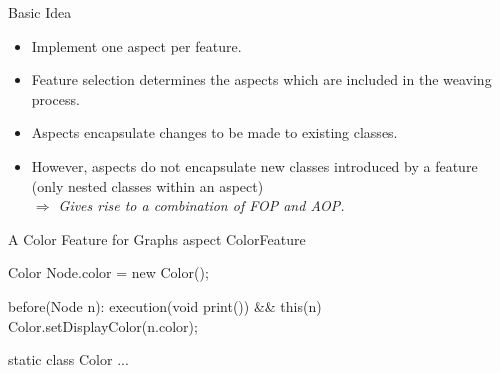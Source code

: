 \begin{frame}[fragile]{\myframetitle}
	\begin{mycolumns}[widths={45,55},animation=none]
		\begin{definition}{Basic Idea}
			\begin{itemize}
				\item Implement one aspect per feature.
				\item Feature selection determines the aspects which are included in the weaving process.
			\end{itemize}
		\end{definition}
		\begin{note}{}
			\begin{itemize}
				\item Aspects encapsulate changes to be made to existing classes. 
				\item However, aspects do not encapsulate new classes introduced by a feature (only nested classes within an aspect)\\
					\emph{$\Rightarrow$ Gives rise to a combination of FOP and AOP.}
			\end{itemize}
		\end{note}
	\mynextcolumn
\begin{codetight}{A Color Feature for Graphs}
aspect ColorFeature {
	Color Node.color = new Color();
	
	before(Node n): execution(void print()) && this(n) {
		Color.setDisplayColor(n.color);
	}
	
	static class Color {
		...
	}
}
\end{codetight}	
	\end{mycolumns}
\end{frame}

